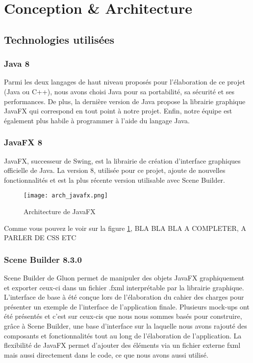 \section{Conception \& Architecture}
\subsection{Technologies utilisées}
\subsubsection{Java 8}
Parmi les deux langages de haut niveau proposés pour l'élaboration de ce projet (Java ou C++), nous avons choisi Java pour sa portabilité, sa sécurité et ses performances. De plus, la dernière version de Java propose la librairie graphique JavaFX qui correspond en tout point à notre projet. Enfin, notre équipe est également plus habile à programmer à l'aide du langage Java.

\subsubsection{JavaFX 8}
JavaFX, successeur de Swing, est la librairie de création d'interface graphiques officielle de Java. La version 8, utilisée pour ce projet, ajoute de nouvelles fonctionnalités et est la plus récente version utilisable avec Scene Builder.

\begin{figure}[h]
    \caption{Architecture de JavaFX}
    \centering
    \texttt{[image: arch\_javafx.png]}
    \label{fig:arch_javafx}
\end{figure}

Comme vous pouvez le voir sur la figure \ref{fig:arch_javafx}, BLA BLA BLA A COMPLETER, A PARLER DE CSS ETC


\subsubsection{Scene Builder 8.3.0}
Scene Builder de Gluon permet de manipuler des objets JavaFX graphiquement et exporter ceux-ci dans un fichier .fxml interprétable par la librairie graphique. L'interface de base à été conçue lors de l'élaboration du cahier des charges pour présenter un exemple de l'interface de l'application finale. Plusieurs mock-ups ont été présentés et c'est sur ceux-cis que nous nous sommes basés pour construire, grâce à Scene Builder, une base d'interface sur la laquelle nous avons rajouté des composants et fonctionnalités tout au long de l'élaboration de l'application. La flexibilité de JavaFX permet d'ajouter des éléments via un fichier externe fxml mais aussi directement dans le code, ce que nous avons aussi utilisé.

